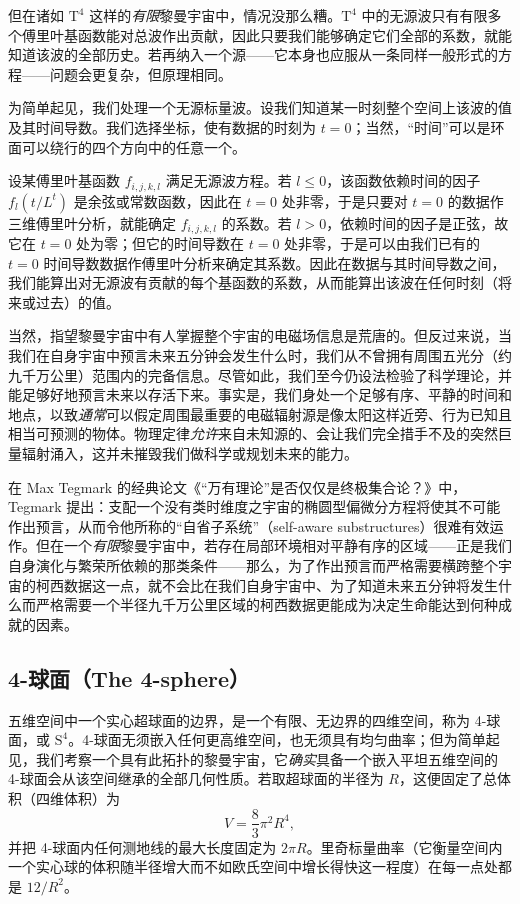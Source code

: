 但在诸如 $\text{T}^{4}$ 这样的\emph{有限}黎曼宇宙中，情况没那么糟。$\text{T}^{4}$ 中的无源波只有有限多个傅里叶基函数能对总波作出贡献，因此只要我们能够确定它们全部的系数，就能知道该波的全部历史。若再纳入一个源——它本身也应服从一条同样一般形式的方程——问题会更复杂，但原理相同。

为简单起见，我们处理一个无源标量波。设我们知道某一时刻整个空间上该波的值及其时间导数。我们选择坐标，使有数据的时刻为 $t=0$；当然，“时间”可以是环面可以绕行的四个方向中的任意一个。

设某傅里叶基函数 $f_{i,j,k,l}$ 满足无源波方程。若 $l\le 0$，该函数依赖时间的因子 $f_{l}(t/L^{t})$ 是余弦或常数函数，因此在 $t=0$ 处非零，于是只要对 $t=0$ 的数据作三维傅里叶分析，就能确定 $f_{i,j,k,l}$ 的系数。若 $l>0$，依赖时间的因子是正弦，故它在 $t=0$ 处为零；但它的时间导数在 $t=0$ 处非零，于是可以由我们已有的 $t=0$ 时间导数数据作傅里叶分析来确定其系数。因此在数据与其时间导数之间，我们能算出对无源波有贡献的每个基函数的系数，从而能算出该波在任何时刻（将来或过去）的值。

当然，指望黎曼宇宙中有人掌握整个宇宙的电磁场信息是荒唐的。但反过来说，当我们在自身宇宙中预言未来五分钟会发生什么时，我们从不曾拥有周围五光分（约九千万公里）范围内的完备信息。尽管如此，我们至今仍设法检验了科学理论，并能足够好地预言未来以存活下来。事实是，我们身处一个足够有序、平静的时间和地点，以致\emph{通常}可以假定周围最重要的电磁辐射源是像太阳这样近旁、行为已知且相当可预测的物体。物理定律\emph{允许}来自未知源的、会让我们完全措手不及的突然巨量辐射涌入，这并未摧毁我们做科学或规划未来的能力。

在 Max Tegmark 的经典论文《“万有理论”是否仅仅是终极集合论？》中，Tegmark 提出：支配一个没有类时维度之宇宙的椭圆型偏微分方程将使其不可能作出预言，从而令他所称的“自省子系统”（self-aware substructures）很难有效运作。但在一个\emph{有限}黎曼宇宙中，若存在局部环境相对平静有序的区域——正是我们自身演化与繁荣所依赖的那类条件——那么，为了作出预言而严格需要横跨整个宇宙的柯西数据这一点，就不会比在我们自身宇宙中、为了知道未来五分钟将发生什么而严格需要一个半径九千万公里区域的柯西数据更能成为决定生命能达到何种成就的因素。

\subsection{4-球面（The 4-sphere）}

五维空间中一个实心超球面的边界，是一个有限、无边界的四维空间，称为 4-球面，或 $\text{S}^{4}$。4-球面无须嵌入任何更高维空间，也无须具有均匀曲率；但为简单起见，我们考察一个具有此拓扑的黎曼宇宙，它\emph{确实}具备一个嵌入平坦五维空间的 4-球面会从该空间继承的全部几何性质。若取超球面的半径为 $R$，这便固定了总体积（四维体积）为
\begin{equation}
V = \frac{8}{3}\pi^{2}R^{4},
\end{equation}
并把 4-球面内任何测地线的最大长度固定为 $2\pi R$。里奇标量曲率（它衡量空间内一个实心球的体积随半径增大而不如欧氏空间中增长得快这一程度）在每一点处都是 $12/R^{2}$。

